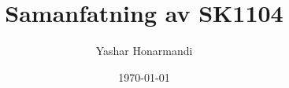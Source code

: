 \documentclass[a4paper, 11pt]{article}
\title{Samanfatning av SK1104}
\author{Yashar Honarmandi}
\date{\today}
\begin{document}
\sloppy

\maketitle

\begin{abstract}
	
\end{abstract}

\thispagestyle{empty}

\newpage

\tableofcontents

\newpage


\twocolumn
\end{document}
